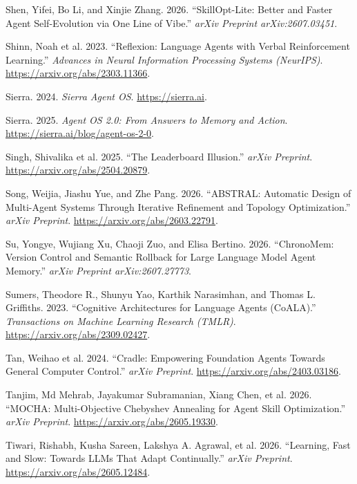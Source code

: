 \documentclass[
]{article}
\newlength{\cslhangindent}
\newenvironment{CSLReferences}[2] %
 {\begin{list}{}{%
  \setlength{\itemindent}{0pt}
  \setlength{\leftmargin}{0pt}
  \setlength{\parsep}{0pt}
  \ifodd #1
   \setlength{\leftmargin}{\cslhangindent}
   \setlength{\itemindent}{-1\cslhangindent}
  \fi
  \setlength{\itemsep}{#2\baselineskip}}}
 {\end{list}}
\begin{document}
\begin{CSLReferences}{1}{1}
Shen, Yifei, Bo Li, and Xinjie Zhang. 2026. {``{SkillOpt-Lite}: Better
and Faster Agent Self-Evolution via One Line of Vibe.''} \emph{arXiv
Preprint arXiv:2607.03451}.

{Shinn, Noah et al.} 2023. {``Reflexion: Language Agents with Verbal
Reinforcement Learning.''} \emph{Advances in Neural Information
Processing Systems (NeurIPS)}. \url{https://arxiv.org/abs/2303.11366}.

Sierra. 2024. \emph{Sierra Agent OS}. \url{https://sierra.ai}.

Sierra. 2025. \emph{Agent {OS} 2.0: From Answers to Memory and Action}.
\url{https://sierra.ai/blog/agent-os-2-0}.

{Singh, Shivalika et al.} 2025. {``The Leaderboard Illusion.''}
\emph{arXiv Preprint}. \url{https://arxiv.org/abs/2504.20879}.

Song, Weijia, Jiashu Yue, and Zhe Pang. 2026. {``{ABSTRAL}: Automatic
Design of Multi-Agent Systems Through Iterative Refinement and Topology
Optimization.''} \emph{arXiv Preprint}.
\url{https://arxiv.org/abs/2603.22791}.

Su, Yongye, Wujiang Xu, Chaoji Zuo, and Elisa Bertino. 2026.
{``{ChronoMem}: Version Control and Semantic Rollback for Large Language
Model Agent Memory.''} \emph{arXiv Preprint arXiv:2607.27773}.

Sumers, Theodore R., Shunyu Yao, Karthik Narasimhan, and Thomas L.
Griffiths. 2023. {``Cognitive Architectures for Language Agents
({CoALA}).''} \emph{Transactions on Machine Learning Research (TMLR)}.
\url{https://arxiv.org/abs/2309.02427}.

{Tan, Weihao et al.} 2024. {``Cradle: Empowering Foundation Agents
Towards General Computer Control.''} \emph{arXiv Preprint}.
\url{https://arxiv.org/abs/2403.03186}.

Tanjim, Md Mehrab, Jayakumar Subramanian, Xiang Chen, et al. 2026.
{``{MOCHA}: Multi-Objective Chebyshev Annealing for Agent Skill
Optimization.''} \emph{arXiv Preprint}.
\url{https://arxiv.org/abs/2605.19330}.

Tiwari, Rishabh, Kusha Sareen, Lakshya A. Agrawal, et al. 2026.
{``Learning, Fast and Slow: Towards {LLMs} That Adapt Continually.''}
\emph{arXiv Preprint}. \url{https://arxiv.org/abs/2605.12484}.


\end{CSLReferences}
\end{document}

